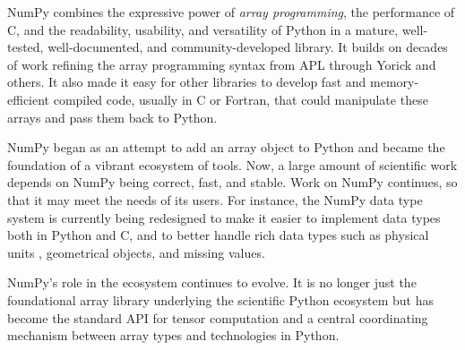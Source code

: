 NumPy combines the expressive power of \emph{array programming}, 
the performance of C, and
the readability, usability, and versatility of Python in a mature,
well-tested, well-documented, and community-developed library.
It builds on decades of work refining the array programming
syntax from APL through Yorick and others.
It also made it easy for other libraries to develop fast and
memory-efficient compiled code, usually in C or Fortran, that could manipulate
these arrays and pass them back to Python.

NumPy began as an attempt to add an array object to Python and became
the foundation of a vibrant ecosystem of tools.
Now, a large amount of scientific work depends on NumPy being correct,
fast, and stable.
Work on NumPy continues, so that it may meet the needs of its users.  For instance, the NumPy data type system is currently being redesigned to make it
easier to implement data types both in Python and C, and to better handle
rich data types such as physical units \cite{astropy,Goldbaum2018},
geometrical objects, and missing values.

NumPy's role in the ecosystem continues to evolve. It is no longer just the foundational array library underlying the
scientific Python ecosystem but has become the standard API for tensor
computation and a central coordinating mechanism between array types and
technologies in Python.
